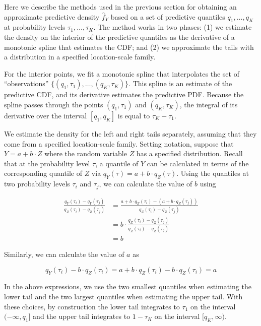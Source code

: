 \documentclass{article}
\begin{document}
Here we describe the methods used in the previous section for obtaining an approximate predictive density $\hat{f}_Y$ based on a set of predictive quantiles $q_1, \ldots, q_K$ at probability levels $\tau_1, \ldots, \tau_K$. The method works in two phases: (1) we estimate the density on the interior of the predictive quantiles as the derivative of a monotonic spline that estimates the CDF; and (2) we approximate the tails with a distribution in a specified location-scale family.

For the interior points, we fit a monotonic spline that interpolates the set of ``observations'' $\{(q_1, \tau_1), \ldots, (q_K, \tau_K)\}$. This spline is an estimate of the predictive CDF, and its derivative estimates the predictive PDF. Because the spline passes through the points $(q_1, \tau_1)$ and $(q_K, \tau_K)$, the integral of its derivative over the interval $[q_1, q_K]$ is equal to $\tau_K - \tau_1$.

We estimate the density for the left and right tails separately, assuming that they come from a specified location-scale family. Setting notation, suppose that $Y = a + b \cdot Z$ where the random variable $Z$ has a specified distribution. Recall that at the probability level $\tau$, a quantile of $Y$ can be calculated in terms of the corresponding quantile of $Z$ via $q_Y(\tau) = a + b \cdot q_Z(\tau)$. Using the quantiles at two probability levels $\tau_i$ and $\tau_j$, we can calculate the value of $b$ using

\begin{align*}
\frac{q_Y(\tau_i) - q_Y(\tau_j)}{q_Z(\tau_i) - q_Z(\tau_j)} &= \frac{a + b \cdot q_Z(\tau_i) - (a + b \cdot q_Z(\tau_j))} {q_Z(\tau_i) - q_Z(\tau_j)} \\
&= b \cdot \frac{q_Z(\tau_i) - q_Z(\tau_j)}{q_Z(\tau_i) - q_Z(\tau_j)} \\
&= b
\end{align*}

Similarly, we can calculate the value of $a$ as

$$q_Y(\tau_i) - b \cdot q_Z(\tau_i) = a + b \cdot q_Z(\tau_i) - b \cdot q_Z(\tau_i) = a$$

In the above expressions, we use the two smallest quantiles when estimating the lower tail and the two largest quantiles when estimating the upper tail. With these choices, by construction the lower tail integrates to $\tau_1$ on the interval $(-\infty, q_1]$ and the upper tail integrates to $1 - \tau_K$ on the interval $[q_K, \infty)$.

\newpage
\end{document}
